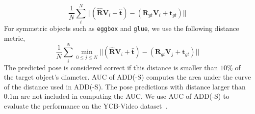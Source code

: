\documentclass[10pt,twocolumn,letterpaper]{article}
\begin{document}
\begin{equation}
  \frac{1}{N} \sum_i^N ||\left(\mathbf{\hat{R}} \mathbf{V}_i + \mathbf{\hat{t}} \right) - \left(\mathbf{R}_{gt} \mathbf{V}_i + \mathbf{t}_{gt} \right)||
\end{equation}
For symmetric objects such as \texttt{eggbox} and \texttt{glue}, we use the following distance metric,
\begin{equation}
  \frac{1}{N} \sum_i^N \min_{0 \le j \le N} ||\left(\mathbf{\hat{R}} \mathbf{V}_i + \mathbf{\hat{t}} \right) - \left(\mathbf{R}_{gt} \mathbf{V}_j + \mathbf{t}_{gt} \right)||
  \label{eq:add_s}
\end{equation}
The predicted pose is considered correct if this distance is smaller than $10$\% of the target object's diameter.
AUC of ADD(-S) computes the area under the curve of the distance used in ADD(-S). The pose predictions with distance larger than $0.1$m are not included in computing the AUC. We use AUC of ADD(-S) to evaluate the performance on the YCB-Video dataset~\cite{xiang2018posecnn}.
\end{document}
